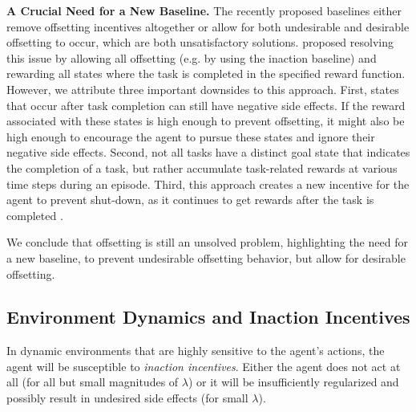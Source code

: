 \documentclass[letterpaper]{article} %
\begin{document}
\textbf{A Crucial Need for a New Baseline.} The recently proposed baselines either remove offsetting incentives altogether or allow for both undesirable and desirable offsetting to occur, which are both unsatisfactory solutions. \citet{krakovna2020avoiding} proposed resolving this issue by allowing all offsetting (e.g. by using the inaction baseline) and rewarding all states where the task is completed in the specified reward function. However, we attribute three important downsides to this approach. First, states that occur after task completion can still have negative side effects. If the reward associated with these states is high enough to prevent offsetting, it might also be high enough to encourage the agent to pursue these states and ignore their negative side effects. Second, not all tasks have a distinct goal state that indicates the completion of a task, but rather accumulate task-related rewards at various time steps during an episode. Third, this approach creates a new incentive for the agent to prevent shut-down, as it continues to get rewards after the task is completed \citep{hadfield2017off}.

We conclude that offsetting is still an unsolved problem, highlighting the need for a new baseline, to prevent undesirable offsetting behavior, but allow for desirable offsetting.


\subsection{Environment Dynamics and Inaction Incentives} \label{sec:environment_dynamics}
In dynamic environments that are highly sensitive to the agent's actions, the agent will be susceptible to \textit{inaction incentives}. Either the agent does not act at all (for all but small magnitudes of $\lambda$) or it will be insufficiently regularized and possibly result in undesired side effects (for small $\lambda$).
\end{document}
